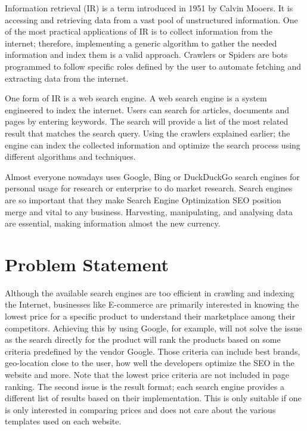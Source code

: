 Information retrieval (IR) is a term introduced in 1951 by Calvin
Mooers. It is accessing and retrieving data from a vast pool of unstructured information. One of the most practical applications of IR is to collect information from the internet; therefore, implementing a generic algorithm to gather the needed information and index them is a valid approach. Crawlers or Spiders are bots programmed to follow specific roles defined by the user to automate fetching and extracting data from the internet.  

One form of IR is a web search engine. A web search engine is a system engineered to index the internet. Users can search for articles, documents and pages by entering keywords. The search will provide a list of the most related result that matches the search query. Using the crawlers explained earlier; the engine can index the collected information and optimize the search process using different algorithms and techniques. 

Almost everyone nowadays uses Google, Bing or DuckDuckGo search engines for personal usage for research or enterprise to do market research. Search engines are so important that they make Search Engine Optimization SEO position merge and vital to any business. Harvesting, manipulating, and analysing data are essential, making information almost the new currency. 

\section{Problem Statement}

Although the available search engines are too efficient in crawling and indexing the Internet, businesses like E-commerce are primarily interested in knowing the lowest price for a specific product to understand their marketplace among their competitors. Achieving this by using Google, for example, will not solve the issue as the search directly for the product will rank the products based on some criteria predefined by the vendor Google. Those criteria can include best brands, geo-location close to the user, how well the developers optimize the SEO in the website and more. Note that the lowest price criteria are not included in page ranking. The second issue is the result format; each search engine provides a different list of results based on their implementation. This is only suitable if one is only interested in comparing prices and does not care about the various templates used on each website.\\

